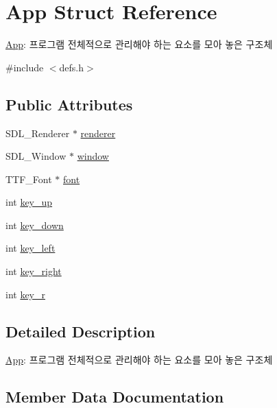 \hypertarget{struct_app}{}\section{App Struct Reference}
\label{struct_app}


\hyperlink{struct_app}{App}\+: 프로그램 전체적으로 관리해야 하는 요소를 모아 놓은 구조체  




{\ttfamily \#include $<$defs.\+h$>$}

\subsection*{Public Attributes}
\begin{DoxyCompactItemize}
\item 
S\+D\+L\+\_\+\+Renderer $\ast$ \hyperlink{struct_app_a4ad29ac304e4ece3ddf9f275fb30f29d}{renderer}
\item 
S\+D\+L\+\_\+\+Window $\ast$ \hyperlink{struct_app_a47d24f96ee9543f2a5f444918347b76b}{window}
\item 
T\+T\+F\+\_\+\+Font $\ast$ \hyperlink{struct_app_afe826a1b4b885d5eef35f42108066e3d}{font}
\item 
int \hyperlink{struct_app_a364051bafd0efb5b1daa089fc134c1f5}{key\+\_\+up}
\item 
int \hyperlink{struct_app_a47a178cbe5ce2b26fd1260fc76b25995}{key\+\_\+down}
\item 
int \hyperlink{struct_app_a2f9c529290eeb69289873a7d49e2ebfc}{key\+\_\+left}
\item 
int \hyperlink{struct_app_a6b10c97c283cfd0237190656dea1e595}{key\+\_\+right}
\item 
int \hyperlink{struct_app_ae8b7c1b6409e8a776a2b2b90c0d8021f}{key\+\_\+r}
\end{DoxyCompactItemize}


\subsection{Detailed Description}
\hyperlink{struct_app}{App}\+: 프로그램 전체적으로 관리해야 하는 요소를 모아 놓은 구조체 

\subsection{Member Data Documentation}
\mbox{\label{struct_app_afe826a1b4b885d5eef35f42108066e3d}} 
